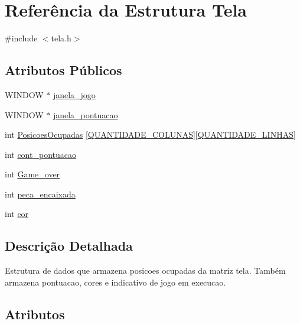 \hypertarget{structTela}{}\section{Referência da Estrutura Tela}
\label{structTela}


{\ttfamily \#include $<$tela.\+h$>$}

\subsection*{Atributos Públicos}
\begin{DoxyCompactItemize}
\item 
W\+I\+N\+D\+O\+W $\ast$ \hyperlink{structTela_adef204d42b36b6cd20f63afceb975bbf}{janela\+\_\+jogo}
\item 
W\+I\+N\+D\+O\+W $\ast$ \hyperlink{structTela_afd07bc2b482faca8e135454373b05abb}{janela\+\_\+pontuacao}
\item 
int \hyperlink{structTela_a7d45fe01c75d7df950c6b310e45b1b2f}{Posicoes\+Ocupadas} \mbox{[}\hyperlink{tela_8h_ad909c6f1c86572916e7cc629ce71fca3}{Q\+U\+A\+N\+T\+I\+D\+A\+D\+E\+\_\+\+C\+O\+L\+U\+N\+A\+S}\mbox{]}\mbox{[}\hyperlink{tela_8h_a6008341dc32241195c0d14dbc6654cf0}{Q\+U\+A\+N\+T\+I\+D\+A\+D\+E\+\_\+\+L\+I\+N\+H\+A\+S}\mbox{]}
\item 
int \hyperlink{structTela_a06de9598d629a343e01fa07a04e9bb84}{cont\+\_\+pontuacao}
\item 
int \hyperlink{structTela_a3715c9d5715131201a83938082a64e9b}{Game\+\_\+over}
\item 
int \hyperlink{structTela_a8663da4a190f026cb9c2242bee520d78}{peca\+\_\+encaixada}
\item 
int \hyperlink{structTela_ae40ae85a9b202cdabf66dee38df39529}{cor}
\end{DoxyCompactItemize}


\subsection{Descrição Detalhada}
Estrutura de dados que armazena posicoes ocupadas da matriz tela. Também armazena pontuacao, cores e indicativo de jogo em execucao. 

\subsection{Atributos}
\hypertarget{structTela_a06de9598d629a343e01fa07a04e9bb84}{}
